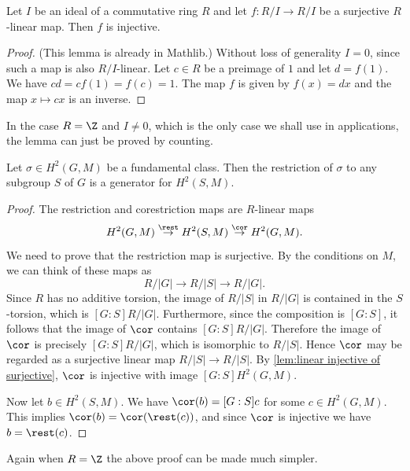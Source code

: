 \begin{lemma} \label{lem:linear injective of surjective}
	\mathlibok
	Let $I$ be an ideal of a commutative ring $R$ and let $f:R/I \to R/I$
	be a surjective $R$-linear map.
	Then $f$ is injective.
\end{lemma}

\begin{proof}
	\mathlibok
	(This lemma is already in Mathlib.)
	Without loss of generality $I=0$, since such a map is also $R/I$-linear.
	Let $c\in R$ be a preimage of $1$ and let $d = f(1)$.
	We have $cd = cf(1) = f(c) = 1$.
	The map $f$ is given by $f(x) = dx$ and the map $x \mapsto cx$ is an inverse.
\end{proof}
\begin{remark} In the case $R=\Z$ and $I\not=0$, which is the only case
	we shall use in applications, the lemma can just be proved by counting.
\end{remark}

\begin{lemma} \label{lem:restriction fundamental class generates}
	Let $\sigma \in H^2(G,M)$ be a fundamental class.
	Then the restriction of $\sigma$ to any subgroup $S$ of $G$
	is a generator for $H^2(S,M)$.
\end{lemma}

\begin{proof}
	The restriction and corestriction maps are $R$-linear maps
	\[
		H^2(G,M) \stackrel{\rest}\to H^2(S,M) \stackrel{\cor}\to H^2(G,M).
	\]
	We need to prove that the restriction map is surjective.
	By the conditions on $M$, we can think of these maps as
	\[
		R / |G| \to R / |S| \to R / |G|.
	\]
	Since $R$ has no additive torsion, the image of $R/|S|$ in $R/|G|$
	is contained in the $S$-torsion, which is $[G:S] R / |G|$.
	Furthermore, since the composition is $[G:S]$,
	it follows that the image of $\cor$ contains $[G:S] R / |G|$.
	Therefore the image of $\cor$ is precisely $[G:S] R / |G|$, which
	is isomorphic to $R/|S|$. Hence $\cor$ may be regarded as a surjective linear map
	$R/|S| \to R/|S|$.
	By \ref{lem:linear injective of surjective}, $\cor$ is injective with image
	$[G:S] H^2(G,M)$.

	Now let $b \in H^2(S,M)$. We have $\cor(b) = [G:S]c$ for some $c \in H^2(G,M)$.
	This implies $\cor(b) = \cor (\rest( c))$, and since $\cor$ is injective we have
	$b = \rest(c)$.
\end{proof}

\begin{remark} Again when $R=\Z$ the above proof can be made much simpler.
\end{remark}

